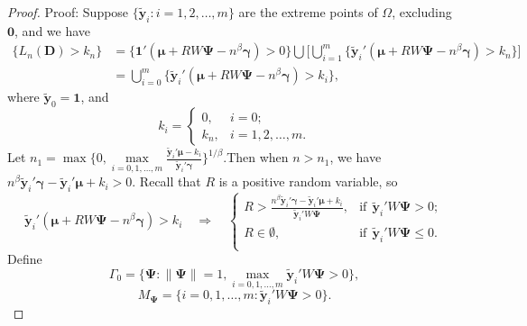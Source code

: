 \documentclass[final,11pt,3p]{article}\usepackage{setspace}
\begin{document}
\begin{proof}{Proof:}
Suppose $\{\tilde{\boldsymbol{y}}_i: i=1,2,\dots, m\}$ are the extreme points of $\Omega$, excluding $\boldsymbol{0}$, and we have
\begin{align*}
\{L_n(\boldsymbol{D})> k_n\} &= \{\boldsymbol{1}' (\boldsymbol{\mu} +  RW\boldsymbol{\Psi} -n^{\beta}\boldsymbol{\gamma}) > 0\} \bigcup \big[\bigcup_{i=1}^m \{\tilde{\boldsymbol{y}}_i' (\boldsymbol{\mu} +  RW\boldsymbol{\Psi} -n^{\beta}\boldsymbol{\gamma}) > k_n\}\big]\\
&= \bigcup_{i=0}^m \{\tilde{\boldsymbol{y}}_i' (\boldsymbol{\mu} +  RW\boldsymbol{\Psi} -n^{\beta}\boldsymbol{\gamma}) > k_i\},
\end{align*}
where $\tilde{\boldsymbol{y}}_0 = \boldsymbol{1}$, and
\begin{equation*}
k_i = \begin{cases}  0, & i=0 ;\\
k_n, & i=1,2,\dots, m.
\end{cases}
\end{equation*}
Let $n_1 = \max\{0,\max \limits_{i=0,1,\dots,m} \frac{ \tilde{\boldsymbol{y}}_i'\boldsymbol{\mu} - k_i}{ \tilde{\boldsymbol{y}}_i'\boldsymbol{\gamma} } \}^{1/\beta}$.Then when $n > n_1$, we have $n^{\beta} \tilde{\boldsymbol{y}}_i'\boldsymbol{\gamma} -  \tilde{\boldsymbol{y}}_i'\boldsymbol{\mu}  + k_i > 0$. Recall that $R$ is a positive random variable, so
\begin{equation*}
\tilde{\boldsymbol{y}}_i' (\boldsymbol{\mu} +  RW\boldsymbol{\Psi} -n^{\beta}\boldsymbol{\gamma}) > k_i \quad \Rightarrow \quad
\begin{cases}
R > \frac{n^{\beta} \tilde{\boldsymbol{y}}_i'\boldsymbol{\gamma}-  \tilde{\boldsymbol{y}}_i'\boldsymbol{\mu}  + k_i}{ \tilde{\boldsymbol{y}}_i' W \boldsymbol{\Psi}}, & \text{if}~~ \tilde{\boldsymbol{y}}_i' W \boldsymbol{\Psi} > 0 ;\\
R \in \emptyset, & \text{if}~~ \tilde{\boldsymbol{y}}_i' W \boldsymbol{\Psi} \le 0 .\\
\end{cases}
\end{equation*}
Define
\begin{equation*}
\Gamma_0 = \{\boldsymbol{\Psi}: \|\boldsymbol{\Psi}\|=1, \max\limits_{i=0,1,\dots,m} \tilde{\boldsymbol{y}}_i' W \boldsymbol{\Psi} > 0 \},
\end{equation*}
\begin{equation*}
M_{\boldsymbol{\Psi}} = \{i = 0,1,\dots, m:  \tilde{\boldsymbol{y}}_i' W \boldsymbol{\Psi} > 0 \}.
\end{equation*}

\end{proof}
\end{document}
